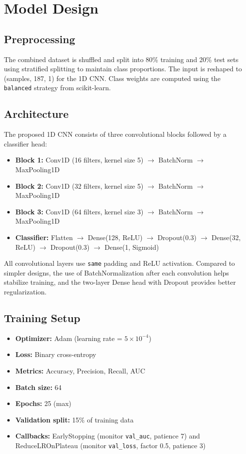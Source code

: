 \documentclass[conference]{IEEEtran}
\begin{document}
\section{Model Design}

\subsection{Preprocessing}

The combined dataset is shuffled and split into 80\% training and 20\% test sets using stratified splitting to maintain class proportions. The input is reshaped to (samples, 187, 1) for the 1D CNN. Class weights are computed using the \texttt{balanced} strategy from scikit-learn.

\subsection{Architecture}

The proposed 1D CNN consists of three convolutional blocks followed by a classifier head:

\begin{itemize}
	\item \textbf{Block 1:} Conv1D (16 filters, kernel size 5) $\rightarrow$ BatchNorm $\rightarrow$ MaxPooling1D
	\item \textbf{Block 2:} Conv1D (32 filters, kernel size 5) $\rightarrow$ BatchNorm $\rightarrow$ MaxPooling1D
	\item \textbf{Block 3:} Conv1D (64 filters, kernel size 3) $\rightarrow$ BatchNorm $\rightarrow$ MaxPooling1D
	\item \textbf{Classifier:} Flatten $\rightarrow$ Dense(128, ReLU) $\rightarrow$ Dropout(0.3) $\rightarrow$ Dense(32, ReLU) $\rightarrow$ Dropout(0.3) $\rightarrow$ Dense(1, Sigmoid)
\end{itemize}

All convolutional layers use \texttt{same} padding and ReLU activation. Compared to simpler designs, the use of BatchNormalization after each convolution helps stabilize training, and the two-layer Dense head with Dropout provides better regularization.

\subsection{Training Setup}

\begin{itemize}
	\item \textbf{Optimizer:} Adam (learning rate = $5 \times 10^{-4}$)
	\item \textbf{Loss:} Binary cross-entropy
	\item \textbf{Metrics:} Accuracy, Precision, Recall, AUC
	\item \textbf{Batch size:} 64
	\item \textbf{Epochs:} 25 (max)
	\item \textbf{Validation split:} 15\% of training data
	\item \textbf{Callbacks:} EarlyStopping (monitor \texttt{val\_auc}, patience 7) and ReduceLROnPlateau (monitor \texttt{val\_loss}, factor 0.5, patience 3)
\end{itemize}
\end{document}
